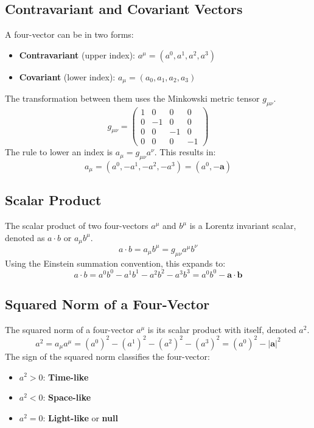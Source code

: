 \documentclass[a4paper,oneside,article]{memoir}
\begin{document}
\subsection{Contravariant and Covariant Vectors}
A four-vector can be in two forms:
\begin{itemize}
    \item \textbf{Contravariant} (upper index): $a^\mu = (a^0, a^1, a^2, a^3)$
    \item \textbf{Covariant} (lower index): $a_\mu = (a_0, a_1, a_2, a_3)$
\end{itemize}
The transformation between them uses the Minkowski metric tensor $g_{\mu\nu}$.
\begin{equation}
g_{\mu\nu} = \begin{pmatrix} 1 & 0 & 0 & 0 \\ 0 & -1 & 0 & 0 \\ 0 & 0 & -1 & 0 \\ 0 & 0 & 0 & -1 \end{pmatrix} \label{eq:metric} \tag{2.31}
\end{equation}
The rule to lower an index is $a_\mu = g_{\mu\nu}a^\nu$. This results in:
\[
a_\mu = (a^0, -a^1, -a^2, -a^3) = (a^0, -\mathbf{a})
\]

\subsection{Scalar Product}
The scalar product of two four-vectors $a^\mu$ and $b^\mu$ is a Lorentz invariant scalar, denoted as $a \cdot b$ or $a_\mu b^\mu$.
\begin{equation}
a \cdot b = a_\mu b^\mu = g_{\mu\nu} a^\mu b^\nu \label{eq:scalarprod}
\end{equation}
Using the Einstein summation convention, this expands to:
\[
a \cdot b = a^0 b^0 - a^1 b^1 - a^2 b^2 - a^3 b^3 = a^0 b^0 - \mathbf{a} \cdot \mathbf{b}
\]

\subsection{Squared Norm of a Four-Vector}
The squared norm of a four-vector $a^\mu$ is its scalar product with itself, denoted $a^2$.
\begin{equation}
a^2 = a_\mu a^\mu = (a^0)^2 - (a^1)^2 - (a^2)^2 - (a^3)^2 = (a^0)^2 - |\mathbf{a}|^2 \label{eq:norm}
\end{equation}
The sign of the squared norm classifies the four-vector:
\begin{itemize}
    \item $a^2 > 0$: \textbf{Time-like}
    \item $a^2 < 0$: \textbf{Space-like}
    \item $a^2 = 0$: \textbf{Light-like} or \textbf{null}
\end{itemize}
\end{document}
